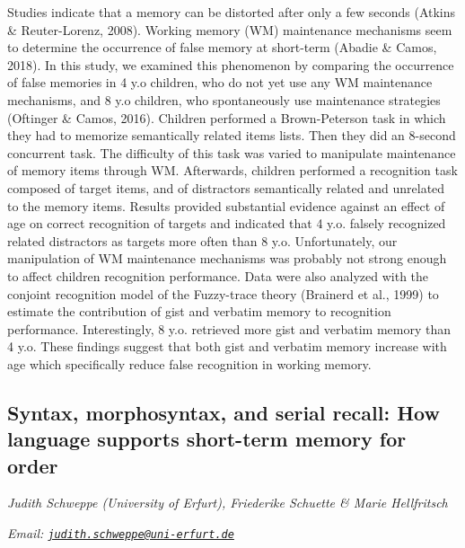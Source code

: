 \documentclass[
  12pt,
]{book}
\begin{document}
Studies indicate that a memory can be distorted after only a few seconds (Atkins \& Reuter-Lorenz, 2008). Working memory (WM) maintenance mechanisms seem to determine the occurrence of false memory at short-term (Abadie \& Camos, 2018). In this study, we examined this phenomenon by comparing the occurrence of false memories in 4 y.o children, who do not yet use any WM maintenance mechanisms, and 8 y.o children, who spontaneously use maintenance strategies (Oftinger \& Camos, 2016). Children performed a Brown-Peterson task in which they had to memorize semantically related items lists. Then they did an 8-second concurrent task. The difficulty of this task was varied to manipulate maintenance of memory items through WM. Afterwards, children performed a recognition task composed of target items, and of distractors semantically related and unrelated to the memory items. Results provided substantial evidence against an effect of age on correct recognition of targets and indicated that 4 y.o. falsely recognized related distractors as targets more often than 8 y.o. Unfortunately, our manipulation of WM maintenance mechanisms was probably not strong enough to affect children recognition performance. Data were also analyzed with the conjoint recognition model of the Fuzzy-trace theory (Brainerd et al., 1999) to estimate the contribution of gist and verbatim memory to recognition performance. Interestingly, 8 y.o. retrieved more gist and verbatim memory than 4 y.o. These findings suggest that both gist and verbatim memory increase with age which specifically reduce false recognition in working memory.

\hypertarget{syntax-morphosyntax-and-serial-recall-how-language-supports-short-term-memory-for-order}{%
\subsection{Syntax, morphosyntax, and serial recall: How language supports short-term memory for order}\label{syntax-morphosyntax-and-serial-recall-how-language-supports-short-term-memory-for-order}}

\emph{Judith Schweppe (University of Erfurt), Friederike Schuette \& Marie Hellfritsch}

\emph{Email: \href{mailto:judith.schweppe@uni-erfurt.de}{\nolinkurl{judith.schweppe@uni-erfurt.de}}}
\end{document}
